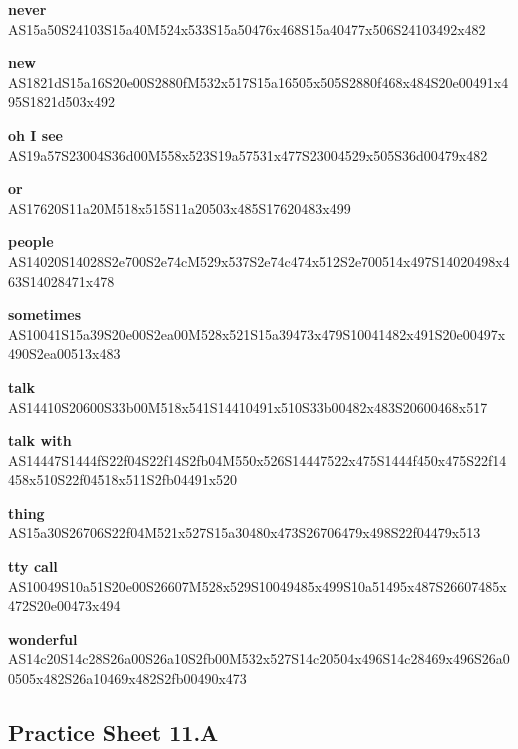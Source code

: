 \documentclass{article}
\begin{document}
\begin{glossary}
\textbf{never}\\
AS15a50S24103S15a40M524x533S15a50476x468S15a40477x506S24103492x482

\textbf{new}\\
AS1821dS15a16S20e00S2880fM532x517S15a16505x505S2880f468x484S20e00491x495S1821d503x492

\textbf{oh I see}\\
AS19a57S23004S36d00M558x523S19a57531x477S23004529x505S36d00479x482

\textbf{or}\\
AS17620S11a20M518x515S11a20503x485S17620483x499

\textbf{people}\\
AS14020S14028S2e700S2e74cM529x537S2e74c474x512S2e700514x497S14020498x463S14028471x478

\textbf{sometimes}\\
AS10041S15a39S20e00S2ea00M528x521S15a39473x479S10041482x491S20e00497x490S2ea00513x483

\textbf{talk}\\
AS14410S20600S33b00M518x541S14410491x510S33b00482x483S20600468x517

\textbf{talk with}\\
AS14447S1444fS22f04S22f14S2fb04M550x526S14447522x475S1444f450x475S22f14458x510S22f04518x511S2fb04491x520

\textbf{thing}\\
AS15a30S26706S22f04M521x527S15a30480x473S26706479x498S22f04479x513

\textbf{tty call}\\
AS10049S10a51S20e00S26607M528x529S10049485x499S10a51495x487S26607485x472S20e00473x494

\textbf{wonderful}\\
AS14c20S14c28S26a00S26a10S2fb00M532x527S14c20504x496S14c28469x496S26a00505x482S26a10469x482S2fb00490x473

\end{glossary}

\subsection{Practice Sheet 11.A}
\end{document}
